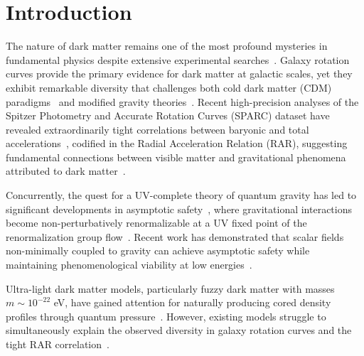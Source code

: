 \documentclass[aps,prd,twocolumn,showpacs,superscriptaddress,groupedaddress,nofootinbib]{revtex4-2}
\begin{document}

\maketitle

\section{Introduction}

The nature of dark matter remains one of the most profound mysteries in fundamental physics despite extensive experimental searches~\cite{Bertone2018,Freese2017,Arcadi2018}. Galaxy rotation curves provide the primary evidence for dark matter at galactic scales, yet they exhibit remarkable diversity that challenges both cold dark matter (CDM) paradigms~\cite{Bullock2017,delPopolo2021,Salucci2019} and modified gravity theories~\cite{Famaey2012,Milgrom2020,Banik2022}. Recent high-precision analyses of the Spitzer Photometry and Accurate Rotation Curves (SPARC) dataset have revealed extraordinarily tight correlations between baryonic and total accelerations~\cite{McGaugh2016,Lelli2017,Li2018}, codified in the Radial Acceleration Relation (RAR), suggesting fundamental connections between visible matter and gravitational phenomena attributed to dark matter~\cite{Chae2020,Petersen2020,Kroupa2023}.

Concurrently, the quest for a UV-complete theory of quantum gravity has led to significant developments in asymptotic safety~\cite{Percacci2017,Reuter2019,Bonanno2020}, where gravitational interactions become non-perturbatively renormalizable at a UV fixed point of the renormalization group flow~\cite{Eichhorn2018,Pereira2019,Reichert2020}. Recent work has demonstrated that scalar fields non-minimally coupled to gravity can achieve asymptotic safety while maintaining phenomenological viability at low energies~\cite{Pawlowski2019,Knorr2021,Basile2021}.

Ultra-light dark matter models, particularly fuzzy dark matter with masses $m \sim 10^{-22}$ eV, have gained attention for naturally producing cored density profiles through quantum pressure~\cite{Hui2017,Ferreira2021,Schive2020}. However, existing models struggle to simultaneously explain the observed diversity in galaxy rotation curves and the tight RAR correlation~\cite{Bar2021,Dalal2022,Rogers2023}.
\end{document}
